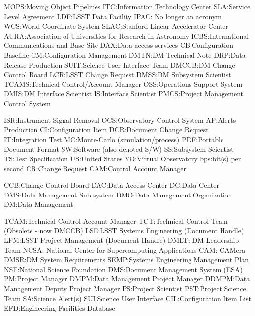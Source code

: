 MOPS:Moving Object Pipelines
ITC:Information Technology Center
SLA:Service Level Agreement
LDF:LSST Data Facility
IPAC: No longer an acronym
WCS:World Coordinate System
SLAC:Stanford Linear Accelerator Center
AURA:Association of Universities for Research in Astronomy
ICBS:International Communications and Base Site
DAX:Data access services
CB:Configuration Baseline
CM:Configuration Management
DMTN:DM Technical Note
DRP:Data Release Production
SUIT:Science User Interface Team
DMCCB:DM Change Control Board
LCR:LSST Change Request
DMSS:DM Subsystem Scientist
TCAMS:Technical Control/Account Manager
OSS:Operations Support System
DMIS:DM Interface Scientist
IS:Interface Scientist
PMCS:Project Management Control System

ISR:Instrument Signal Removal
OCS:Observatory Control System
AP:Alerts Production
CI:Configuration Item
DCR:Document Change Request
IT:Integration Test
MC:Monte-Carlo (simulation/process)
PDF:Portable Document Format
SW:Software (also denoted S/W)
SS:Subsystem Scientist
TS:Test Specification
US:United States
VO:Virtual Observatory
bps:bit(s) per second
CR:Change Request
CAM:Control Account Manager

CCB:Change Control Board
DAC:Data Access Center
DC:Data Center
DMS:Data Management Sub-system
DMO:Data Management Organization
DM:Data Management

TCAM:Technical Control Account Manager
TCT:Technical Control Team (Obsolete - now DMCCB)
LSE:LSST Systems Engineering (Document Handle)
LPM:LSST Project Management (Document Handle)
DMLT: DM Leadership Team
NCSA: National Center for Supercomputing Applications
CAM: CAMera
DMSR:DM System Requirements
SEMP:Systems Engineering Management Plan
NSF:National Science Foundation
DMS:Document Management System (ESA)
PM:Project Manager
DMPM:Data Management Project Manager
DDMPM:Data Management Deputy Project Manager
PS:Project Scientist
PST:Project Science Team
SA:Science Alert(s)
SUI:Science User Interface
CIL:Configuration Item List
EFD:Engineering Facilities Database
